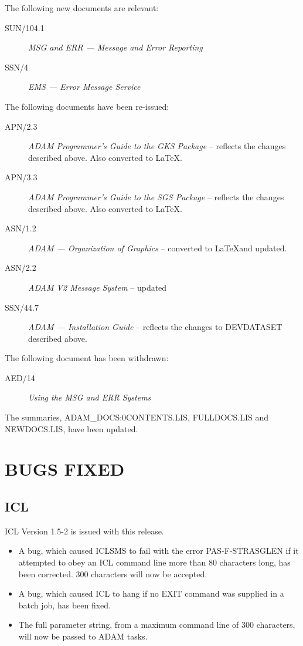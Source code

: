 The following new documents are relevant:
\begin{description}
\item[SUN/104.1] {\it MSG and ERR --- Message and Error Reporting}
\item[SSN/4] {\it EMS --- Error Message Service}
\end{description}

The following documents have been re-issued:
\begin{description}
\item[APN/2.3] {\it ADAM Programmer's Guide to the GKS Package} -- reflects
the changes described above. Also converted to \LaTeX.
\item[APN/3.3] {\it ADAM Programmer's Guide to the SGS Package} -- reflects
the changes described above. Also converted to \LaTeX.
\item[ASN/1.2] {\it ADAM --- Organization of Graphics} -- converted to
\LaTeX and updated.
\item[ASN/2.2] {\it ADAM V2 Message System} -- updated
\item[SSN/44.7] {\it ADAM --- Installation Guide} -- reflects
the changes to DEVDATASET described above.
\end{description}

The following document has been withdrawn:
\begin{description}
\item[AED/14] {\it Using the MSG and ERR Systems}
\end{description}

The summaries, ADAM\_DOCS:0CONTENTS.LIS, FULLDOCS.LIS and NEWDOCS.LIS, have
been updated.

\section{BUGS FIXED}
\subsection{ICL}
ICL Version 1.5-2 is issued with this release.
\begin{itemize}
\item A bug, which caused ICLSMS to fail with the error PAS-F-STRASGLEN if
it attempted to obey an ICL command line more than 80 characters long, has been
corrected.
300 characters will now be accepted.
\item A bug, which caused ICL to hang if no EXIT command was supplied in a
batch job, has been fixed.
\item The full parameter string, from a maximum command line of 300 characters,
will now be passed to ADAM tasks.
\end{itemize}


